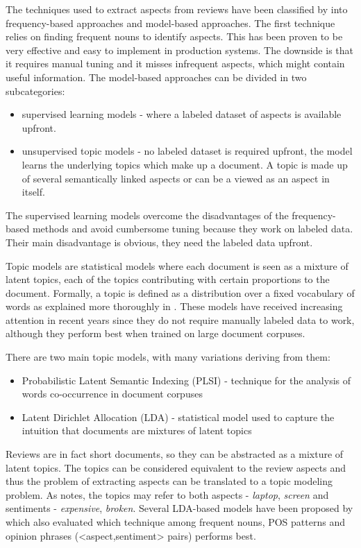 The techniques used to extract aspects from reviews have been classified by \citet{BingLiu2012} into frequency-based approaches and model-based approaches. The first technique relies on finding frequent nouns to identify aspects. This has been proven to be very effective and easy to implement in production systems. The downside is that it requires manual tuning and it misses infrequent aspects, which might contain useful information. The model-based approaches can be divided in two subcategories: 
\begin{itemize}
\item supervised learning models - where a labeled dataset of aspects is available upfront.
\item unsupervised topic models - no labeled dataset is required upfront, the model learns the underlying topics which make up a document. A topic is made up of several semantically linked aspects or can be a viewed as an aspect in itself.
\end{itemize}

The supervised learning models overcome the disadvantages of the frequency-based methods and avoid cumbersome tuning because they work on labeled data. Their main disadvantage is obvious, they need the labeled data upfront.

Topic models are statistical models where each document is seen as a mixture of latent topics, each of the topics contributing with certain proportions to the document. Formally, a topic is defined as a distribution over a fixed vocabulary of words as explained more thoroughly in \citet{Blei2012}. These models have received increasing attention in recent years since they do not require manually labeled data to work, although they perform best when trained on large document corpuses. 

There are two main topic models, with many variations deriving from them:
\begin{itemize}
\item Probabilistic Latent Semantic Indexing (PLSI) - technique for the analysis of words co-occurrence in document corpuses
\item Latent Dirichlet Allocation (LDA) - statistical model used to capture the intuition that documents are mixtures of latent topics
\end{itemize}

Reviews are in fact short documents, so they can be abstracted as a mixture of latent topics. The topics can be considered equivalent to the review aspects and thus the problem of extracting aspects can be translated to a topic modeling problem. As \citet{Moghaddam2013} notes, the topics may refer to both aspects - \textit{laptop}, \textit{screen} and sentiments - \textit{expensive}, \textit{broken}. Several LDA-based models have been proposed by \citet{Moghaddam:2012:DLM:2396761.2396863} which also evaluated which technique among frequent nouns, POS patterns and opinion phrases (<aspect,sentiment> pairs) performs best.

